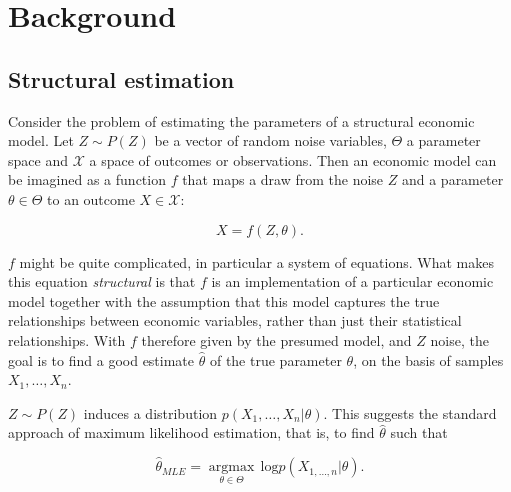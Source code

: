 
\section{Background}
\label{sec:background}

\subsection{Structural estimation}
\label{sec:structural_estimation}

Consider the problem of estimating the parameters of a structural economic model.
Let $Z \sim P(Z)$ be a vector of random noise variables, $\Theta$ a parameter space and $\mathcal{X}$ a space of outcomes or observations.
Then an economic model can be imagined as a function $f$ that maps a draw from the noise $Z$ and a parameter $\theta \in \Theta$ to an outcome $X \in \mathcal{X}$:

\begin{equation}
    X = f(Z, \theta).
\end{equation}

$f$ might be quite complicated, in particular a system of equations.
What makes this equation \textit{structural} is that $f$ is an implementation of a particular economic model together with the assumption that this model captures the true relationships between economic variables, rather than just their statistical relationships. %
With $f$ therefore given by the presumed model, and $Z$ noise, the goal is to find a good estimate $\hat{\theta}$ of the true parameter $\theta$, on the basis of samples $X_1, \ldots, X_n$.

$Z \sim P(Z)$ induces a distribution $p(X_1, \ldots, X_n|\theta)$.
This suggests the standard approach of maximum likelihood estimation, that is, to find $\hat{\theta}$ such that

\begin{equation}
    \hat{\theta}_{MLE} = \underset{\theta\in\Theta}{\operatorname{\arg \max}}\,\text{log} p(X_{1, \ldots, n}|\theta).
\end{equation}

